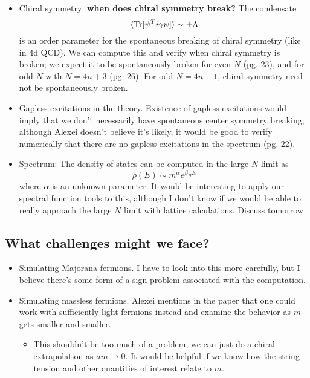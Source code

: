 \begin{itemize}
	\item Chiral symmetry: \textbf{when does chiral symmetry break?} The condensate
	\begin{equation}
		\langle \mathrm{Tr} [ \psi^T i\gamma \psi ] \rangle \sim \pm\Lambda
	\end{equation}
	is an order parameter for the spontaneous breaking of chiral symmetry (like in 4d QCD). We can compute this and verify when chiral symmetry is broken; we expect it to be spontaneously broken for even $N$ (pg. 23), and for odd $N$ with $N = 4n + 3$ (pg. 26). For odd $N = 4n + 1$, chiral symmetry need not be spontaneously broken. 
	
	\item Gapless excitations in the theory. Existence of gapless excitations would imply that we don't necessarily have spontaneous center symmetry breaking; although Alexei doesn't believe it's likely, it would be good to verify numerically that there are no gapless excitations in the spectrum (pg. 22). 
	
	\item Spectrum: The density of states can be computed in the large $N$ limit as
	\begin{equation}
		\rho(E) \sim m^\alpha e^{\beta_H E}
	\end{equation}
	where $\alpha$ is an unknown parameter. It would be interesting to apply our spectral function tools to this, although I don't know if we would be able to really approach the large $N$ limit with lattice calculations. {\color{red}Discuss tomorrow}
\end{itemize}

\subsection{What challenges might we face?}

\begin{itemize}
	\item Simulating Majorana fermions. I have to look into this more carefully, but I believe there's some form of a sign problem associated with the computation. 
	\item Simulating massless fermions. Alexei mentions in the paper that one could work with sufficiently light fermions instead and examine the behavior as $m$ gets smaller and smaller. 
	\begin{itemize}
		\item This shouldn't be too much of a problem, we can just do a chiral extrapolation as $am\rightarrow 0$. It would be helpful if we know how the string tension and other quantities of interest relate to $m$. 
	\end{itemize}
\end{itemize}

